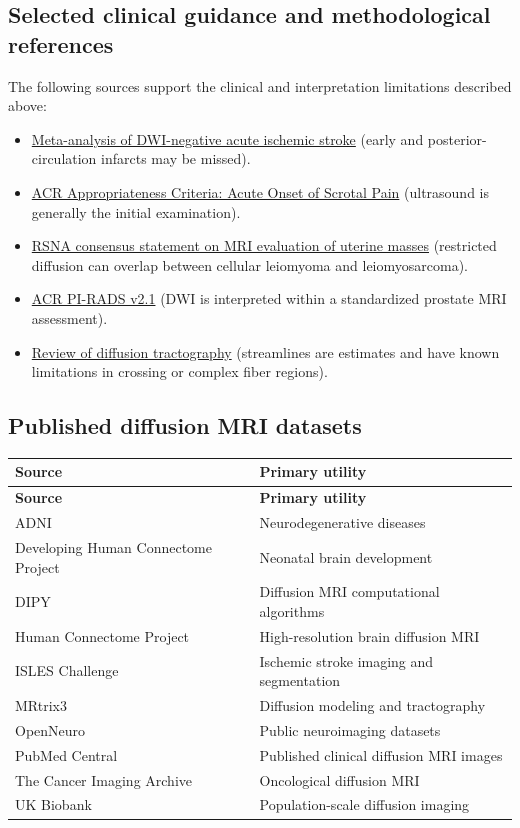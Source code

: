 \subsection{Selected clinical guidance and methodological references}
The following sources support the clinical and interpretation limitations described above:
\begin{itemize}
\item \href{https://pmc.ncbi.nlm.nih.gov/articles/PMC5513816/}{Meta-analysis of DWI-negative acute ischemic stroke} (early and posterior-circulation infarcts may be missed).
\item \href{https://acsearch.acr.org/docs/69363/Narrative}{ACR Appropriateness Criteria: Acute Onset of Scrotal Pain} (ultrasound is generally the initial examination).
\item \href{https://pubs.rsna.org/radiographics/doi/full/10.1148/radiol.211658}{RSNA consensus statement on MRI evaluation of uterine masses} (restricted diffusion can overlap between cellular leiomyoma and leiomyosarcoma).
\item \href{https://www.acr.org/-/media/ACR/Files/RADS/PI-RADS/PIRADS-V2-1.pdf}{ACR PI-RADS v2.1} (DWI is interpreted within a standardized prostate MRI assessment).
\item \href{https://pmc.ncbi.nlm.nih.gov/articles/PMC3119814/}{Review of diffusion tractography} (streamlines are estimates and have known limitations in crossing or complex fiber regions).
\end{itemize}

\subsection{Published diffusion MRI datasets}
\begin{longtable}{@{}p{}p{}@{}}
\toprule
\textbf{Source} & \textbf{Primary utility} \\
\midrule
\endfirsthead
\toprule
\textbf{Source} & \textbf{Primary utility} \\
\midrule
\endhead
ADNI & Neurodegenerative diseases \\
Developing Human Connectome Project & Neonatal brain development \\
DIPY & Diffusion MRI computational algorithms \\
Human Connectome Project & High-resolution brain diffusion MRI \\
ISLES Challenge & Ischemic stroke imaging and segmentation \\
MRtrix3 & Diffusion modeling and tractography \\
OpenNeuro & Public neuroimaging datasets \\
PubMed Central & Published clinical diffusion MRI images \\
The Cancer Imaging Archive & Oncological diffusion MRI \\
UK Biobank & Population-scale diffusion imaging \\
\bottomrule
\end{longtable}

